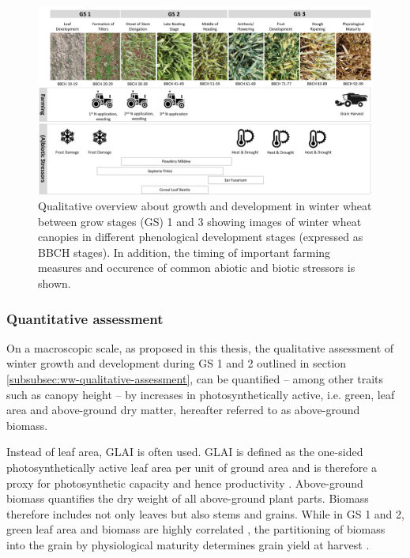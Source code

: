 \begin{figure}[H]
    \centering
    \includegraphics[width=\textwidth]{01-Introduction/img/wheat_developement.pdf}
    \caption{Qualitative overview about growth and development in winter wheat between grow stages (GS) 1 and 3 showing images of winter wheat canopies in different phenological development stages (expressed as \gls{BBCH} stages). In addition, the timing of important farming measures and occurence of common abiotic and biotic stressors is shown.}
    \label{fig:ww-growth-qualitative}
\end{figure}

\subsubsection{Quantitative assessment}
On a macroscopic scale, as proposed in this thesis, the qualitative assessment of winter growth and development during \gls{GS} 1 and 2 outlined in section \ref{subsubsec:ww-qualitative-assessment}, can be quantified -- among other traits such as canopy height \citep[for example]{kronenberg_monitoring_2017} -- by increases in photosynthetically active, i.e. green, leaf area and above-ground dry matter, hereafter referred to as above-ground biomass.

Instead of leaf area, \gls{GLAI} is often used. \gls{GLAI} is defined as the one-sided photosynthetically active leaf area per unit of ground area \citep{watson_dependence_1958,maddonni_leaf_1996} and is therefore a proxy for photosynthetic capacity and hence productivity \citep{gitelson_productivity_2015}. Above-ground biomass quantifies the dry weight of all above-ground plant parts. Biomass therefore includes not only leaves but also stems and grains. While in \gls{GS} 1 and 2, green leaf area and biomass are highly correlated \citep{aase_relationship_1978}, the partitioning of biomass into the grain by physiological maturity determines grain yield at harvest \citep{singh_harvest_1971}. 

